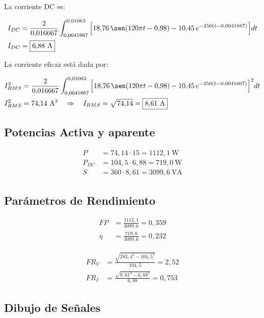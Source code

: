 \documentclass[11pt]{article}
\begin{document}
La corriente DC es:

\begin{align*}
I_{DC} &= \frac{2}{0{,}016667}\int_{0{,}0041667}^{0{,}01063}
          \Big[18{,}76\,\sen(120\pi t - 0{,}98) - 10{,}45\,e^{-250(t-0{,}0041667)}\Big]dt \\
I_{DC} &= \boxed{6{,}88\ \text{A}}
\end{align*}

La corriente eficaz est\'a dada por:

\begin{align*}
I_{RMS}^2 &= \frac{2}{0{,}016667}\int_{0{,}0041667}^{0{,}01063}
             \Big[18{,}76\,\sen(120\pi t - 0{,}98) - 10{,}45\,e^{-250(t-0{,}0041667)}\Big]^2 dt \\
I_{RMS}^2 &= 74{,}14\ \text{A}^2 \quad\Rightarrow\quad I_{RMS} = \sqrt{74{,}14} = \boxed{8{,}61\ \text{A}}
\end{align*}

\subsection{Potencias Activa y aparente}

\begin{align*}
P &= 74{,}14 \cdot 15 = \boxed{1112{,}1\ \text{W}} \\
P_{DC} &= 104{,}5 \cdot 6{,}88 = \boxed{719{,}0\ \text{W}} \\
S &= 360 \cdot 8{,}61 = \boxed{3099{,}6\ \text{VA}}
\end{align*}

\subsection{Par\'ametros de Rendimiento}

\begin{align*}
FP &= \frac{1112{,}1}{3099{,}6} = \boxed{0{,}359} \\
\eta &= \frac{719{,}0}{3099{,}6} = \boxed{0{,}232}
\end{align*}

\begin{align*}
FR_V &= \frac{\sqrt{283{,}4^2 - 104{,}5^2}}{104{,}5} = \boxed{2{,}52} \\
FR_I &= \frac{\sqrt{8{,}61^2 - 6{,}88^2}}{6{,}88} = \boxed{0{,}753}
\end{align*}

\subsection{Dibujo de Se\~nales}
\end{document}
